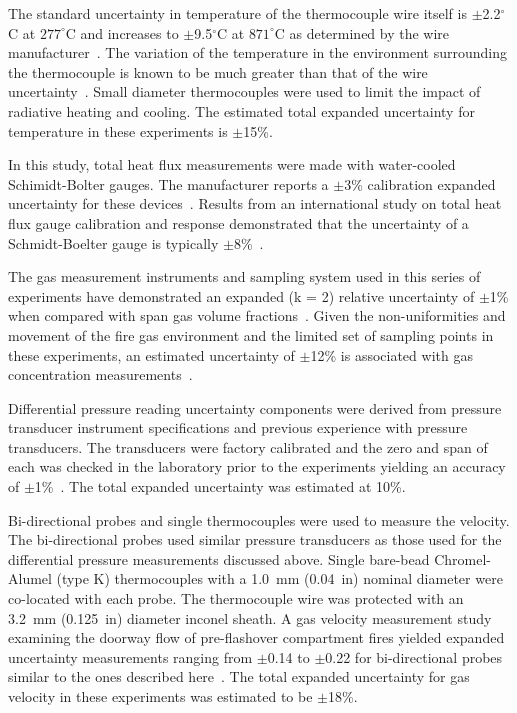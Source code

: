 \documentclass[12pt,oneside]{book}
\begin{document}
The standard uncertainty in temperature of the thermocouple wire itself is $\pm$2.2$^{\circ}$C at $277^{\circ}$C and increases to $\pm$9.5$^{\circ}$C at $871^{\circ}$C as determined by the wire manufacturer~\cite{Omega:2004}. The variation of the temperature in the environment surrounding the thermocouple is known to be much greater than that of the wire uncertainty~\cite{Blevins:1999,Pitts:2003}. Small diameter thermocouples were used to limit the impact of radiative heating and cooling. The estimated total expanded uncertainty for temperature in these experiments is $\pm$15\%.

In this study, total heat flux measurements were made with water-cooled Schimidt-Bolter gauges. The manufacturer reports a $\pm$3\% calibration expanded uncertainty for these devices~\cite{Medtherm:2003}. Results from an international study on total heat flux gauge calibration and response demonstrated that the uncertainty of a Schmidt-Boelter gauge is typically $\pm$8\%~\cite{Pitts:2006}.

The gas measurement instruments and sampling system used in this series of experiments have demonstrated an expanded (k = 2) relative uncertainty of $\pm$1\% when compared with span gas volume fractions~\cite{Bundy:2007}. Given the non-uniformities and movement of the fire gas environment and the limited set of sampling points in these experiments, an estimated uncertainty of $\pm$12\% is associated with gas concentration measurements~\cite{Lock:1}.

Differential pressure reading uncertainty components were derived from pressure transducer instrument specifications and previous experience with pressure transducers. The transducers were factory calibrated and the zero and span of each was checked in the laboratory prior to the experiments yielding an accuracy of $\pm$1\%~\cite{Setra:2002}. The total expanded uncertainty was estimated at 10\%.

Bi-directional probes and single thermocouples were used to measure the velocity. The bi-directional probes used similar pressure transducers as those used for the differential pressure measurements discussed above. Single bare-bead Chromel-Alumel (type K) thermocouples with a 1.0~mm (0.04~in) nominal diameter were co-located with each probe. The thermocouple wire was protected with an 3.2~mm (0.125~in) diameter inconel sheath. A gas velocity measurement study examining the doorway flow of pre-flashover compartment fires yielded expanded uncertainty measurements ranging from $\pm$0.14 to $\pm$0.22 for bi-directional probes similar to the ones described here~\cite{Bryant:FSJ2009}. The total expanded uncertainty for gas velocity in these experiments was estimated to be $\pm$18\%.
\end{document}
